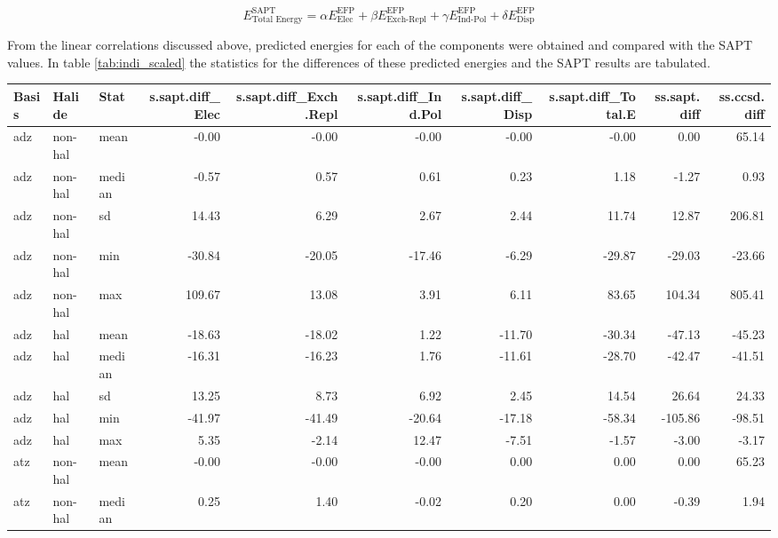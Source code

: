 \begin{multicols}{2}
\begin{equation}
    E^{\text{SAPT}}_{\text{Total Energy}} = \alpha E_{\text{Elec}}^{\text{EFP}} +
                                            \beta E_{\text{Exch-Repl}}^{\text{EFP}} +
                                            \gamma E_{\text{Ind-Pol}}^{\text{EFP}} +
                                            \delta E_{\text{Disp}}^{\text{EFP}}
\end{equation}

From the linear correlations discussed above, predicted energies for each of the components were obtained and compared with the SAPT values. 
In table 
\ref{tab:indi_scaled}
the statistics for the differences of these predicted energies and the SAPT results are tabulated. 
\end{multicols}

\begin{table}[ht]
\centering
\scriptsize
\begin{tabular}{lllrrrrrrr}
  \hline
Basis & Halide & Stat & s.sapt.diff\_Elec & s.sapt.diff\_Exch.Repl & s.sapt.diff\_Ind.Pol & s.sapt.diff\_Disp & s.sapt.diff\_Total.E & ss.sapt.diff & ss.ccsd.diff \\ 
  \hline
adz & non-hal & mean & -0.00 & -0.00 & -0.00 & -0.00 & -0.00 & 0.00 & 65.14 \\ 
  adz & non-hal & median & -0.57 & 0.57 & 0.61 & 0.23 & 1.18 & -1.27 & 0.93 \\ 
  adz & non-hal & sd & 14.43 & 6.29 & 2.67 & 2.44 & 11.74 & 12.87 & 206.81 \\ 
  adz & non-hal & min & -30.84 & -20.05 & -17.46 & -6.29 & -29.87 & -29.03 & -23.66 \\ 
  adz & non-hal & max & 109.67 & 13.08 & 3.91 & 6.11 & 83.65 & 104.34 & 805.41 \\ 
  adz & hal & mean & -18.63 & -18.02 & 1.22 & -11.70 & -30.34 & -47.13 & -45.23 \\ 
  adz & hal & median & -16.31 & -16.23 & 1.76 & -11.61 & -28.70 & -42.47 & -41.51 \\ 
  adz & hal & sd & 13.25 & 8.73 & 6.92 & 2.45 & 14.54 & 26.64 & 24.33 \\ 
  adz & hal & min & -41.97 & -41.49 & -20.64 & -17.18 & -58.34 & -105.86 & -98.51 \\ 
  adz & hal & max & 5.35 & -2.14 & 12.47 & -7.51 & -1.57 & -3.00 & -3.17 \\ 
  atz & non-hal & mean & -0.00 & -0.00 & -0.00 & 0.00 & 0.00 & 0.00 & 65.23 \\ 
  atz & non-hal & median & 0.25 & 1.40 & -0.02 & 0.20 & 0.00 & -0.39 & 1.94 \\ 

\end{tabular}
\end{table}
